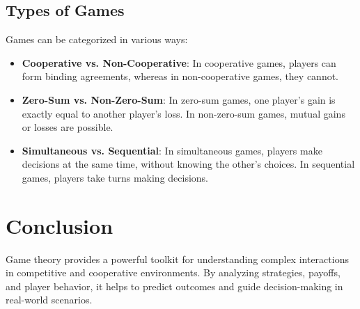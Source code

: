 \documentclass[a4paper,12pt]{article}
\begin{document}
\subsection*{Types of Games}
Games can be categorized in various ways:
\begin{itemize}
    \item \textbf{Cooperative vs. Non-Cooperative}: In cooperative games, players can form binding agreements, whereas in non-cooperative games, they cannot.
    \item \textbf{Zero-Sum vs. Non-Zero-Sum}: In zero-sum games, one player’s gain is exactly equal to another player’s loss. In non-zero-sum games, mutual gains or losses are possible.
    \item \textbf{Simultaneous vs. Sequential}: In simultaneous games, players make decisions at the same time, without knowing the other’s choices. In sequential games, players take turns making decisions.
\end{itemize}

\section*{Conclusion}
Game theory provides a powerful toolkit for understanding complex interactions in competitive and cooperative environments. By analyzing strategies, payoffs, and player behavior, it helps to predict outcomes and guide decision-making in real-world scenarios.
\end{document}
